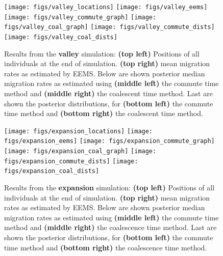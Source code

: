 \documentclass{article}
\begin{document}
\begin{figure}
\centering
    \texttt{[image: figs/valley\_locations]}
    \texttt{[image: figs/valley\_eems]}
    \texttt{[image: figs/valley\_commute\_graph]}
    \texttt{[image: figs/valley\_coal\_graph]}
    \texttt{[image: figs/valley\_commute\_dists]}
    \texttt{[image: figs/valley\_coal\_dists]}
    \caption{
        Results from the \textbf{valley} simulation:
        \textbf{(top left)} Positions of all individuals at the end of simulation.
        \textbf{(top right)} mean migration rates as estimated by EEMS.
        Below are shown
        posterior median migration rates 
            as estimated using 
            \textbf{(middle left)} the commute time method and
            \textbf{(middle right)} the coalescent time method.
        Last are shown the posterior distributions, for
            \textbf{(bottom left)} the commute time method and
            \textbf{(bottom right)} the coalescent time method.
        \label{sfig:valley_results}
    }
\end{figure}

\begin{figure}
\centering
    \texttt{[image: figs/expansion\_locations]}
    \texttt{[image: figs/expansion\_eems]}
    \texttt{[image: figs/expansion\_commute\_graph]}
    \texttt{[image: figs/expansion\_coal\_graph]}
    \texttt{[image: figs/expansion\_commute\_dists]}
    \texttt{[image: figs/expansion\_coal\_dists]}
    \caption{
        Results from the \textbf{expansion} simulation:
        \textbf{(top left)} Positions of all individuals at the end of simulation.
        \textbf{(top right)} mean migration rates as estimated by EEMS.
        Below are shown
        posterior median migration rates 
            as estimated using 
            \textbf{(middle left)} the commute time method and
            \textbf{(middle right)} the coalescence time method.
        Last are shown the posterior distributions, for
            \textbf{(bottom left)} the commute time method and
            \textbf{(bottom right)} the coalescence time method.
        \label{sfig:expansion_results}
    }
\end{figure}
\end{document}
